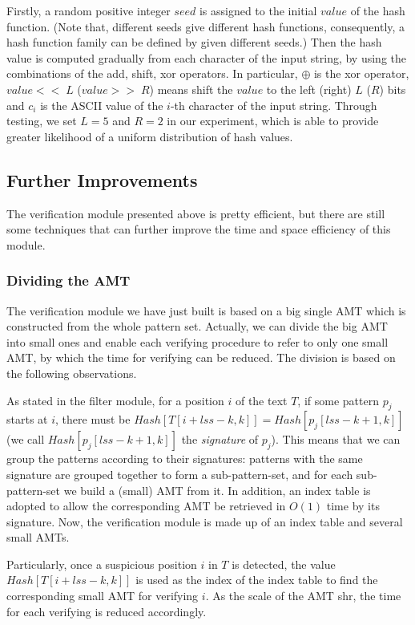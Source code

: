 \documentclass{article}
\begin{document}
Firstly, a random positive integer $seed$ is assigned to the initial
$value$ of the hash function. (Note that, different seeds give
different hash functions, consequently, a hash function family can be
defined by given different seeds.) Then the hash value is computed
gradually from each character of the input string, by using the
combinations of the \textsf{add, shift, xor} operators. In particular,
$\oplus$ is the \textsf{xor} operator, $value << \;L$ ($value >> \;R$)
means shift the $value$ to the left (right) $L$ ($R$) bits and $c_i$
is the ASCII value of the $i$-th character of the input
string. Through testing, we set $L=5$ and $R=2$ in our experiment,
which is able to provide greater likelihood of a uniform distribution
of hash values.

\subsection{Further Improvements}
\label{sec:further improments}

The verification module presented above is pretty efficient, but there
are still some techniques that can further improve the time and space
efficiency of this module.

\subsubsection{Dividing the AMT}
\label{sec:divide amt}

The verification module we have just built is based on a big single
AMT which is constructed from the whole pattern set. Actually, we can
divide the big AMT into small ones and enable each verifying procedure
to refer to only one small AMT, by which the time for verifying can be
reduced. The division is based on the following observations.

As stated in the filter module, for a position $i$ of the text $T$, if
some pattern $p_j$ starts at $i$, there must be
$Hash[T[i+lss-k,k]] = Hash[p_j[lss-k+1,k]]$ (we call
$Hash[p_j[lss-k+1,k]]$ the \emph{signature} of $p_j$). This means that
we can group the patterns according to their signatures: patterns with
the same signature are grouped together to form a sub-pattern-set, and
for each sub-pattern-set we build a (small) AMT from it. In addition,
an index table is adopted to allow the corresponding AMT be retrieved
in $O(1)$ time by its signature. Now, the verification module is made
up of an index table and several small AMTs.

Particularly, once a suspicious position $i$ in $T$ is detected, the
value $Hash[T[i+lss-k,k]]$ is used as the index of the index table to
find the corresponding small AMT for verifying $i$. As the scale of
the AMT shr, the time for each verifying is reduced accordingly.
\end{document}
